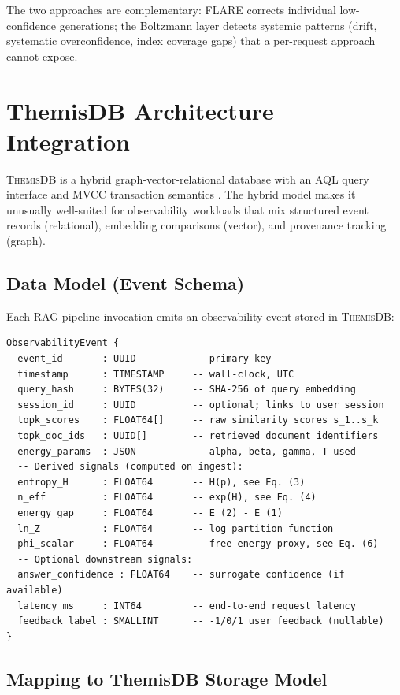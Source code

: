 \documentclass[11pt,a4paper]{article}
\newcommand{\themisdb}{\textsc{ThemisDB}}
\theoremstyle{definition}
\begin{document}
The two approaches are complementary: FLARE corrects individual
low-confidence generations; the Boltzmann layer detects systemic
patterns (drift, systematic overconfidence, index coverage gaps) that
a per-request approach cannot expose.

\section{ThemisDB Architecture Integration}
\label{sec:integration}

\themisdb{} is a hybrid graph-vector-relational database with an
AQL query interface and MVCC transaction semantics
\citep{themisdb2026}.
The hybrid model makes it unusually well-suited for observability
workloads that mix structured event records (relational), embedding
comparisons (vector), and provenance tracking (graph).

\subsection{Data Model (Event Schema)}

Each RAG pipeline invocation emits an observability event stored in
\themisdb{}:

\begin{verbatim}
ObservabilityEvent {
  event_id       : UUID          -- primary key
  timestamp      : TIMESTAMP     -- wall-clock, UTC
  query_hash     : BYTES(32)     -- SHA-256 of query embedding
  session_id     : UUID          -- optional; links to user session
  topk_scores    : FLOAT64[]     -- raw similarity scores s_1..s_k
  topk_doc_ids   : UUID[]        -- retrieved document identifiers
  energy_params  : JSON          -- alpha, beta, gamma, T used
  -- Derived signals (computed on ingest):
  entropy_H      : FLOAT64       -- H(p), see Eq. (3)
  n_eff          : FLOAT64       -- exp(H), see Eq. (4)
  energy_gap     : FLOAT64       -- E_(2) - E_(1)
  ln_Z           : FLOAT64       -- log partition function
  phi_scalar     : FLOAT64       -- free-energy proxy, see Eq. (6)
  -- Optional downstream signals:
  answer_confidence : FLOAT64    -- surrogate confidence (if available)
  latency_ms     : INT64         -- end-to-end request latency
  feedback_label : SMALLINT      -- -1/0/1 user feedback (nullable)
}
\end{verbatim}

\subsection{Mapping to ThemisDB Storage Model}
\end{document}
